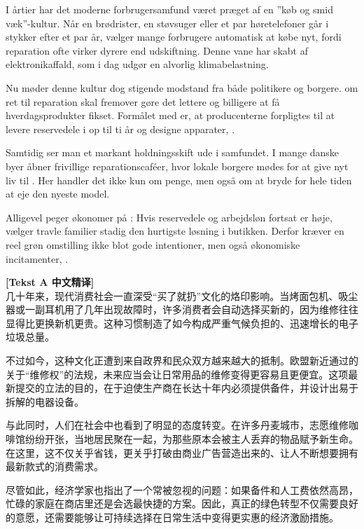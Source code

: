 I årtier har det moderne forbrugersamfund været præget af en ”køb og smid væk”-kultur. Når en brødrister, en støvsuger eller et par høretelefoner går i stykker efter et par år, vælger mange forbrugere automatisk at købe nyt, fordi reparation ofte virker dyrere end udskiftning. Denne vane har skabt  af elektronikaffald, som i dag udgør en alvorlig klimabelastning.

Nu møder denne kultur dog stigende modstand fra både politikere og borgere.  om ret til reparation skal fremover gøre det lettere og billigere at få hverdagsprodukter fikset. Formålet med  er, at producenterne forpligtes til at levere reservedele i op til ti år og designe apparater, .

Samtidig ser man et markant holdningsskift ude i samfundet. I mange danske byer åbner frivillige reparationscaféer, hvor lokale borgere mødes for at give nyt liv til . Her handler det ikke kun om penge, men også om at bryde  for hele tiden at eje den nyeste model.

Alligevel peger økonomer på : Hvis reservedele og arbejdsløn fortsat er høje, vælger travle familier stadig den hurtigste løsning i butikken. Derfor kræver en reel grøn omstilling ikke blot gode intentioner, men også økonomiske incitamenter, .

\begin{transbox}
\small
\textbf{\color{NCDTeal}[Tekst A 中文精译]}\\
几十年来，现代消费社会一直深受“买了就扔”文化的烙印影响。当烤面包机、吸尘器或一副耳机用了几年出现故障时，许多消费者会自动选择买新的，因为维修往往显得比更换新机更贵。这种习惯制造了如今构成严重气候负担的、迅速增长的电子垃圾总量。

不过如今，这种文化正遭到来自政界和民众双方越来越大的抵制。欧盟新近通过的关于“维修权”的法规，未来应当会让日常用品的维修变得更容易且更便宜。这项最新提交的立法的目的，在于迫使生产商在长达十年内必须提供备件，并设计出易于拆解的电器设备。

与此同时，人们在社会中也看到了明显的态度转变。在许多丹麦城市，志愿维修咖啡馆纷纷开张，当地居民聚在一起，为那些原本会被主人丢弃的物品赋予新生命。在这里，这不仅关乎省钱，更关乎打破由商业广告营造出来的、让人不断想要拥有最新款式的消费需求。

尽管如此，经济学家也指出了一个常被忽视的问题：如果备件和人工费依然高昂，忙碌的家庭在商店里还是会选最快捷的方案。因此，真正的绿色转型不仅需要良好的意愿，还需要能够让可持续选择在日常生活中变得更实惠的经济激励措施。
\end{transbox}

